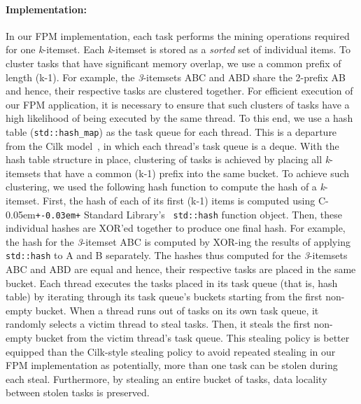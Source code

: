 \documentclass{IOS-Book-Article}
\newcommand{\Cpp}{C\kern-0.05em\texttt{+\kern-0.03em+}}
\newcommand{\code}[1]{\lstinline[basicstyle=\sffamily]{#1}}
\begin{document}
\paragraph{Implementation:} In our FPM implementation, each task performs the
mining operations required for one \textit{k}-itemset. Each \textit{k}-itemset
is stored as a \textit{sorted} set of individual items. 
To cluster tasks that have significant memory overlap, we use a common prefix
of length (k-1).  For example, the \textit{3}-itemsets ABC and ABD share the
2-prefix AB and hence, their respective tasks are clustered together. For
efficient execution of our FPM application, it is necessary to ensure that such
clusters of tasks have a high likelihood of being executed by the same thread.
To this end, we use a hash table (\code{std::hash_map}) as the task queue for
each thread.  This is a departure from the Cilk model~\cite{FrigoLeRa98}, in
which each thread's task queue is a deque. With the hash table structure in
place, clustering of tasks is achieved by placing all \textit{k}-itemsets that
have a common (k-1) prefix into the same bucket. To achieve such clustering, we
used the following hash function to compute the hash of a \textit{k}-itemset.
First, the hash of each of its first (k-1) items is computed using \Cpp{}
Standard Library's~\cite{stepa.lee-1994:the.s:TR} \code{std::hash} function
object. Then, these individual hashes are XOR'ed together to produce one final
hash.  For example, the hash for the \textit{3}-itemset ABC is computed by
XOR-ing the results of applying \code{std::hash} to A and B separately. The
hashes thus computed for the \textit{3}-itemsets ABC and ABD are equal
and hence, their respective tasks are placed in the same bucket.
Each thread executes the tasks placed in its task queue (that is, hash table)
by iterating through its task queue's buckets starting from the first non-empty
bucket. 
When a thread runs out of tasks on its own task queue, it randomly selects a
victim thread to steal tasks. Then, it steals the first non-empty bucket from
the victim thread's task queue. This stealing policy is better equipped than
the Cilk-style stealing policy to avoid repeated stealing in our FPM
implementation as potentially, more than one task can be stolen during each
steal.  Furthermore, by stealing an entire bucket of tasks, data locality
between stolen tasks is preserved.
\end{document}
